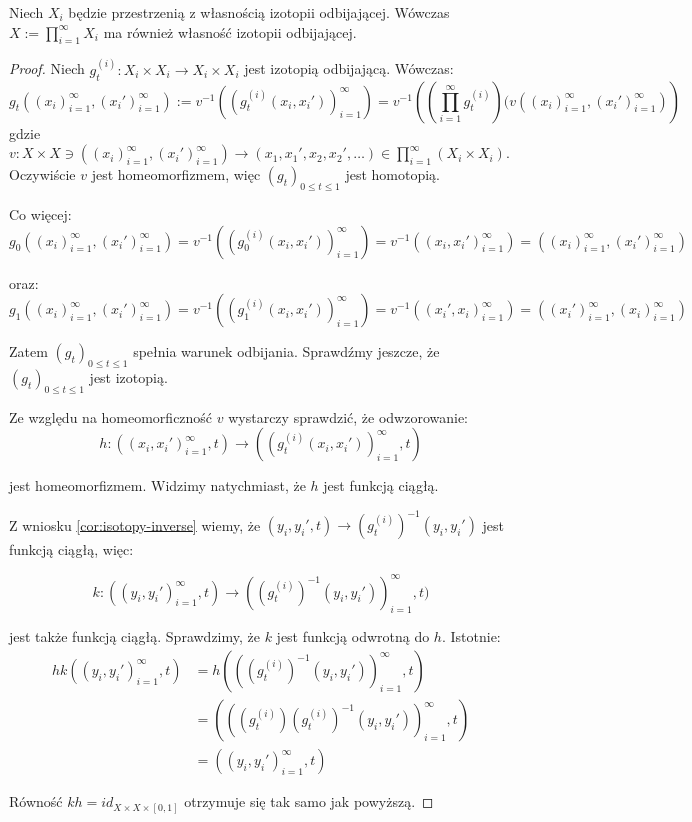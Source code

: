 \begin{ex} \label{rip-product}
  Niech $X_i$ będzie przestrzenią z własnością izotopii odbijającej. Wówczas $X := \prod_{i=1}^\infty X_i$ ma również własność izotopii odbijającej.
  \begin{proof}
    Niech $g_t^{(i)}: X_i \times X_i \rightarrow X_i \times X_i$ jest izotopią odbijającą.
    Wówczas:
    \begin{equation} \label{rip-product-def}
      g_t((x_i)_{i=1}^\infty, (x_i')_{i=1}^\infty) :=
      v^{-1}((g_t^{(i)}(x_i, x_i'))_{i=1}^\infty) =
      v^{-1}\left(\left(\prod_{i=1}^\infty g_t^{(i)}\right)(v((x_i)_{i=1}^\infty, (x_i')_{i=1}^\infty)\right)
    \end{equation}
    gdzie $v: X \times X \ni ((x_i)_{i=1}^\infty, (x_i')_{i=1}^\infty) \rightarrow (x_1, x_1', x_2, x_2', \ldots) \in \prod_{i=1}^\infty (X_i \times X_i)$. Oczywiście $v$ jest homeomorfizmem, więc $(g_t)_{0 \leq t \leq 1}$ jest homotopią.
    
    Co więcej:
    \[
      g_0((x_i)_{i=1}^\infty, (x_i')_{i=1}^\infty) =
      v^{-1}((g_0^{(i)}(x_i, x_i'))_{i=1}^\infty) =
      v^{-1}((x_i, x_i')_{i=1}^\infty) = ((x_i)_{i=1}^\infty, (x_i')_{i=1}^\infty)
    \]
    
    oraz:
    \[
      g_1((x_i)_{i=1}^\infty, (x_i')_{i=1}^\infty) =
      v^{-1}((g_1^{(i)}(x_i, x_i'))_{i=1}^\infty) =
      v^{-1}((x_i', x_i)_{i=1}^\infty) = ((x_i')_{i=1}^\infty, (x_i)_{i=1}^\infty)
    \]
    
    Zatem $(g_t)_{0 \leq t \leq 1}$ spełnia warunek odbijania. Sprawdźmy jeszcze, że $(g_t)_{0 \leq t \leq 1}$ jest izotopią.
    
    Ze względu na homeomorficzność $v$ wystarczy sprawdzić, że odwzorowanie:
    \[h: ((x_i, x_i')_{i=1}^\infty, t) \rightarrow ((g_t^{(i)}(x_i, x_i'))_{i=1}^\infty, t)\]
    
    jest homeomorfizmem. Widzimy natychmiast, że $h$ jest funkcją ciągłą.
    
    Z wniosku \ref{cor:isotopy-inverse} wiemy, że $(y_i, y_i', t) \rightarrow (g_t^{(i)})^{-1}(y_i, y_i')$ jest funkcją ciągłą, więc:
    
    \[
      k: ((y_i, y_i')_{i=1}^\infty, t) \rightarrow ((g_t^{(i)})^{-1}(y_i, y_i'))_{i=1}^\infty, t)
    \]
    
    jest także funkcją ciągłą. Sprawdzimy, że $k$ jest funkcją odwrotną do $h$. Istotnie:
    \begin{align*}
      hk((y_i, y_i')_{i=1}^\infty, t) &= h(((g_t^{(i)})^{-1}(y_i, y_i'))_{i=1}^\infty, t) \\
      &= (((g_t^{(i)})(g_t^{(i)})^{-1}(y_i, y_i'))_{i=1}^\infty, t) \\
      &= ((y_i, y_i')_{i=1}^\infty, t)
    \end{align*}
    
    Równość $kh = id_{X \times X \times [0,1]}$ otrzymuje się tak samo jak powyższą.

  \end{proof}
\end{ex}

